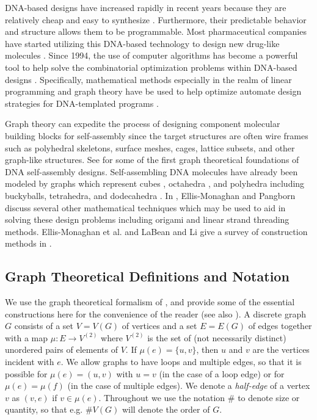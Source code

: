 \documentclass{elsarticle}
\theoremstyle{definition}
\theoremstyle{remark}
\theoremstyle{plain}
\theoremstyle{plain}
\begin{document}
DNA-based designs have increased rapidly in recent years because they are relatively cheap and easy to synthesize \cite{hansen2018DNA}. Furthermore, their predictable behavior and structure allows them to be programmable. Most pharmaceutical
companies have  started utilizing this DNA-based technology to design new drug-like molecules \cite{goodnow2017dna}. Since 1994, the use of computer algorithms has become a powerful tool to help solve the combinatorial optimization problems within DNA-based designs \cite{adleman1994molecular}.   Specifically, mathematical methods especially in the realm of  linear programming and graph theory have be used to help optimize automate design strategies for DNA-templated programs \cite{ andersen2015towards, hansen2018DNA}.

Graph theory can expedite the process of designing component molecular building blocks for self-assembly since the target structures are often wire frames such as polyhedral skeletons, surface meshes, cages, lattice subsets, and other graph-like structures. See \cite{jonoska2006spectrum} for some of the first graph theoretical foundations of DNA self-assembly designs. Self-assembling DNA molecules have already been modeled by graphs which represent cubes \cite{chen1991synthesis}, octahedra \cite{rothemund2006folding, zhang1994construction}, and polyhedra including buckyballs, tetrahedra, and dodecahedra \cite{he2008hierarchical}. In \cite{ellis2013example}, Ellis-Monaghan and Pangborn discuss several other mathematical techniques which may be used to aid in solving these design problems including origami and linear strand threading methods. Ellis-Monaghan et al. and LaBean and Li give a survey of construction methods in \cite{ ellis2019tile, labean2007constructing}. 



 

\subsection{Graph Theoretical Definitions and Notation}\label{sec:definitions}  
We use the graph theoretical formalism of \cite{ellis2019tile}, and provide some of the essential constructions here  for the convenience of the reader (see also \cite{jonoska2006spectrum}).  A discrete graph $G$ consists of a set $V=V(G)$ of vertices and a set $E=E(G)$ of edges together with a map $\mu:E \rightarrow V^{(2)}$  where $V^{(2)}$ is the set of (not necessarily distinct) unordered pairs of elements of $V$. If $\mu(e)=\{u,v\}$, then $u$ and $v$ are the vertices incident with $e$. We allow graphs to have loops and multiple edges, so that it is possible for $\mu(e) = (u,v)$ with $u=v$ (in the case of a loop edge) or for $\mu(e)=\mu(f)$ (in the case of multiple edges). We denote a \emph{half-edge} of a vertex $v$ as $(v,e)$ if $v \in \mu(e)$. Throughout we use the notation $\#$ to denote size or quantity, so that e.g. $\#V(G)$ will denote the order of $G$.
\end{document}
